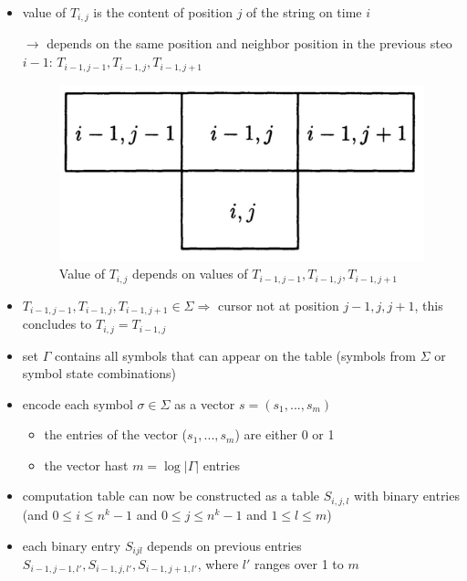 \documentclass[a4]{scrartcl}
\begin{document}
\begin{itemize}
\item value of $T_{i,j}$ is the content of position $j$ of the string on time $i$
\item[$\rightarrow$] depends on the same position and neighbor position in the previous steo $i-1$: $T_{i-1,j-1}, T_{i-1,j}, T_{i-1,j+1}$
\item[] \begin{figure}[H]
\begin{center}
\includegraphics[scale=0.3]{depends.jpg}
\end{center}
\caption{Value of $T_{i,j}$ depends on values of $T_{i-1,j-1}, T_{i-1,j}, T_{i-1,j+1}$}
\end{figure}
\item $T_{i-1,j-1}, T_{i-1,j}, T_{i-1,j+1} \in \Sigma \Rightarrow$ cursor not at position $j-1, j, j+1$, this concludes to $T_{i,j}=T_{i-1,j}$ \\
\item set $\Gamma$ contains all symbols that can appear on the table (symbols from $\Sigma$ or symbol state combinations)
\item encode each symbol $\sigma \in \Sigma$ as a vector $s=(s_1,...,s_m)$ 
\begin{itemize}
\item the entries of the vector ($s_1,...,s_m$) are either 0 or 1
\item the vector hast $m=\log |\Gamma|$ entries
\end{itemize}
\item computation table can now be constructed as a table $S_{i,j,l}$ with binary entries (and $0 \leq i \leq n^k -1$ and $0 \leq j \leq n^k -1$ and $1 \leq l \leq m$)
\item each binary entry $S_{ijl}$ depends on previous entries $S_{i-1,j-1,l'}, S_{i-1,j,l'}, S_{i-1,j+1,l'}$, where $l'$ ranges over 1 to $m$
\end{itemize}
\end{document}

